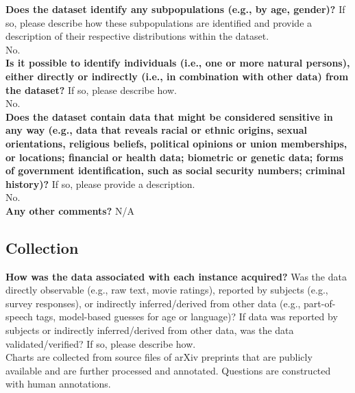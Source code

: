     \textcolor{\sectioncolor}{\textbf{Does the dataset identify any subpopulations (e.g., by age, gender)?
    }
    If so, please describe how these subpopulations are identified and
    provide a description of their respective distributions within the dataset.
    } \\
    No. \\
    
    \textcolor{\sectioncolor}{\textbf{Is it possible to identify individuals (i.e., one or more natural persons),
    either directly or indirectly (i.e., in combination with other data) from
    the dataset?
    }
    If so, please describe how.
    } \\
    No. \\
    
    \textcolor{\sectioncolor}{\textbf{Does the dataset contain data that might be considered sensitive in any way
    (e.g., data that reveals racial or ethnic origins, sexual orientations,
    religious beliefs, political opinions or union memberships, or locations;
    financial or health data; biometric or genetic data; forms of government
    identification, such as social security numbers; criminal history)?
    }
    If so, please provide a description.
    } \\
    No. \\
    
    \textcolor{\sectioncolor}{\textbf{Any other comments?
    }} N/A \\

\subsection{Collection}

    \textcolor{\sectioncolor}{\textbf{How was the data associated with each instance acquired?
    }
    Was the data directly observable (e.g., raw text, movie ratings),
    reported by subjects (e.g., survey responses), or indirectly
    inferred/derived from other data (e.g., part-of-speech tags, model-based
    guesses for age or language)? If data was reported by subjects or
    indirectly inferred/derived from other data, was the data
    validated/verified? If so, please describe how.
    } \\
    Charts are collected from source files of arXiv preprints that are publicly available and are further processed and annotated. Questions are constructed with human annotations. \\
    
